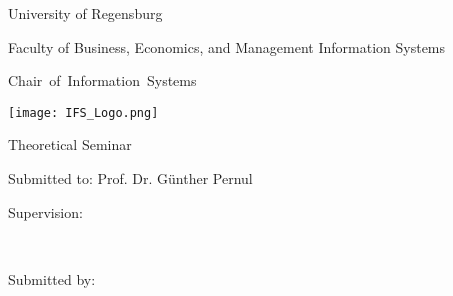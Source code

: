 %
%
%

\thispagestyle{empty}
\begin{titlepage}


\begin{adjustwidth}{-2cm}{}


\renewcommand{\thepage}{}

\begin{center}


\large{University of Regensburg\\}

\large{Faculty of Business, Economics, and Management Information Systems\\}

\large{\mbox{{Chair of Information Systems}}}

\vspace*{30mm}

\Large{\textbf{\titlethema}}

\vspace*{25mm}
\texttt{[image: IFS\_Logo.png]}
\vspace*{15mm}

\Large{Theoretical Seminar}

\vspace*{10mm}



\Large{Submitted to: Prof. Dr. Günther Pernul\\}

\Large{Supervision: \supervisor\\} 


\vspace*{10mm}


\large{\submissiondate\\}
\vfill

\end{center}
\vspace*{6mm}
\begin{flushleft}
Submitted by:\\
\vspace*{7pt}

\vspace*{7pt}


\end{flushleft}
\end{adjustwidth}
\end{titlepage}
